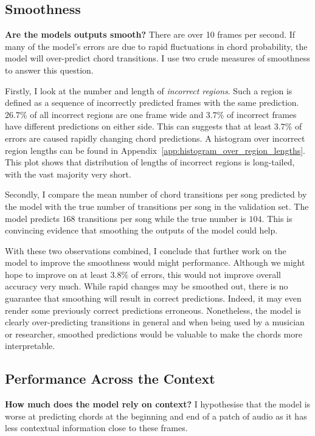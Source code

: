 \subsection{Smoothness}\label{sec:smoothness}

\textbf{Are the models outputs smooth?} There are over 10 frames per second. If many of the model's errors are due to rapid fluctuations in chord probability, the model will over-predict chord transitions. I use two crude measures of smoothness to answer this question.

Firstly, I look at the number and length of \emph{incorrect regions}. Such a region is defined as a sequence of incorrectly predicted frames with the same prediction. $26.7\%$ of all incorrect regions are one frame wide and $3.7\%$ of incorrect frames have different predictions on either side. This can suggests that at least $3.7\%$ of errors are caused rapidly changing chord predictions. A histogram over incorrect region lengths can be found in Appendix~\ref{app:histogram_over_region_lengths}. This plot shows that distribution of lengths of incorrect regions is long-tailed, with the vast majority very short.

Secondly, I compare the mean number of chord transitions per song predicted by the model with the true number of transitions per song in the validation set. The model predicts $168$ transitions per song while the true number is $104$. This is convincing evidence that smoothing the outputs of the model could help. 

With these two observations combined, I conclude that further work on the model to improve the smoothness would might performance. Although we might hope to improve on at least $3.8\%$ of errors, this would not improve overall accuracy very much. While rapid changes may be smoothed out, there is no guarantee that smoothing will result in correct predictions. Indeed, it may even render some previously correct predictions erroneous. Nonetheless, the model is clearly over-predicting transitions in general and when being used by a musician or researcher, smoothed predictions would be valuable to make the chords more interpretable.

\subsection{Performance Across the Context}\label{sec:crnn_performance_across_context}

\textbf{How much does the model rely on context?} I hypothesise that the model is worse at predicting chords at the beginning and end of a patch of audio as it has less contextual information close to these frames. 

